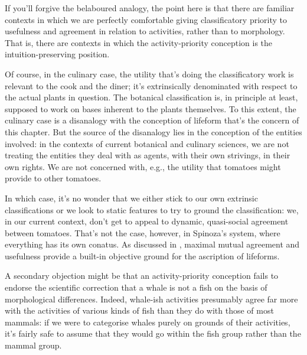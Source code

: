 \documentclass{article}
\begin{document}
If you'll forgive the belaboured analogy, the point here is that there are familiar contexts in which we are perfectly comfortable giving classificatory priority to usefulness and agreement in relation to activities, rather than to morphology. That is, there are contexts in which the activity-priority conception is the intuition-preserving position.

Of course, in the culinary case, the utility that's doing the classificatory work is relevant to the cook and the diner; it's extrinsically denominated with respect to the actual plants in question. The botanical classification is, in principle at least, supposed to work on bases inherent to the plants themselves. To this extent, the culinary case is a disanalogy with the conception of lifeform that's the concern of this chapter. But the source of the disanalogy lies in the conception of the entities involved: in the contexts of current botanical and culinary sciences, we are not treating the entities they deal with as agents, with their own strivings, in their own rights. We are not concerned with, e.g., the utility that tomatoes might provide to other tomatoes.

In which case, it's no wonder that we either stick to our own extrinsic classifications or we look to static features to try to ground the classification: we, in our current context, don't get to appeal to dynamic, quasi-social agreement between tomatoes. That's not the case, however, in Spinoza's system, where everything has its own conatus. As discussed in , maximal mutual agreement and usefulness provide a built-in objective ground for the ascription of lifeforms.

A secondary objection might be that an activity-priority conception fails to endorse the scientific correction that a whale is not a fish on the basis of morphological differences. Indeed, whale-ish activities presumably agree far more with the activities of various kinds of fish than they do with those of most mammals: if we were to categorise whales purely on grounds of their activities, it's fairly safe to assume that they would go within the fish group rather than the mammal group.
\end{document}
